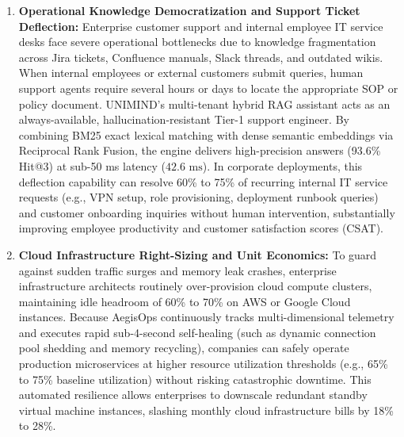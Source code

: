 \documentclass[12pt,onecolumn,draftclsnofoot]{IEEEtran}
\begin{document}
\begin{enumerate}
    \item \textbf{Operational Knowledge Democratization and Support Ticket Deflection:}
    Enterprise customer support and internal employee IT service desks face severe operational bottlenecks due to knowledge fragmentation across Jira tickets, Confluence manuals, Slack threads, and outdated wikis. When internal employees or external customers submit queries, human support agents require several hours or days to locate the appropriate SOP or policy document. UNIMIND's multi-tenant hybrid RAG assistant acts as an always-available, hallucination-resistant Tier-1 support engineer. By combining BM25 exact lexical matching with dense semantic embeddings via Reciprocal Rank Fusion, the engine delivers high-precision answers (93.6\% Hit@3) at sub-50 ms latency ($42.6\text{ ms}$). In corporate deployments, this deflection capability can resolve 60\% to 75\% of recurring internal IT service requests (e.g., VPN setup, role provisioning, deployment runbook queries) and customer onboarding inquiries without human intervention, substantially improving employee productivity and customer satisfaction scores (CSAT).

    \item \textbf{Cloud Infrastructure Right-Sizing and Unit Economics:}
    To guard against sudden traffic surges and memory leak crashes, enterprise infrastructure architects routinely over-provision cloud compute clusters, maintaining idle headroom of 60\% to 70\% on AWS or Google Cloud instances. Because AegisOps continuously tracks multi-dimensional telemetry and executes rapid sub-4-second self-healing (such as dynamic connection pool shedding and memory recycling), companies can safely operate production microservices at higher resource utilization thresholds (e.g., 65\% to 75\% baseline utilization) without risking catastrophic downtime. This automated resilience allows enterprises to downscale redundant standby virtual machine instances, slashing monthly cloud infrastructure bills by 18\% to 28\%.
\end{enumerate}
\end{document}
